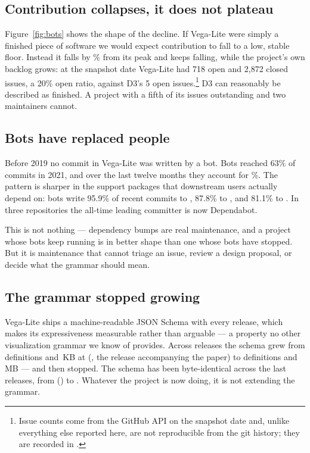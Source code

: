 \documentclass[9pt,twocolumn,letterpaper]{article}
\begin{document}
\subsection{Contribution collapses, it does not plateau}

Figure~\ref{fig:bots} shows the shape of the decline. If Vega-Lite were simply
a finished piece of software we would expect contribution to fall to a low,
stable floor. Instead it falls by \vldecline\% from its \vlpeakyear{} peak and
keeps falling, while the project's own backlog grows: at the snapshot date
Vega-Lite had 718 open and 2{,}872 closed issues, a 20\% open ratio, against
D3's 5 open issues.\footnote{Issue counts come from the GitHub API on the
snapshot date and, unlike everything else reported here, are not reproducible
from the git history; they are recorded in .} D3 can
reasonably be described as finished. A project with a fifth of its issues
outstanding and two maintainers cannot.

\subsection{Bots have replaced people}

Before 2019 no commit in Vega-Lite was written by a bot. Bots reached 63\% of
commits in 2021, and over the last twelve months they account for
\vlbotshare\%. The pattern is sharper in the support packages that downstream
users actually depend on: bots write 95.9\% of recent commits to
, 87.8\% to , and 81.1\% to
. In three repositories the all-time leading committer is
now Dependabot.

This is not nothing --- dependency bumps are real maintenance, and a project
whose bots keep running is in better shape than one whose bots have stopped.
But it is maintenance that cannot triage an issue, review a design proposal, or
decide what the grammar should mean.

\subsection{The grammar stopped growing}

Vega-Lite ships a machine-readable JSON Schema with every release, which makes
its expressiveness measurable rather than arguable --- a property no other
visualization grammar we know of provides. Across \schemareleases{} releases
the schema grew from \schemafirstdefs{} definitions and \schemafirstkb\,KB at
\schemafirsttag{} (\schemafirstyear{}, the release accompanying the paper) to
\schemapeakdefs{} definitions and \schemalastmb\,MB --- and then stopped. The
schema has been byte-identical across the last \schemafrozen{} releases, from
\schemafrozenfrom{} (\schemafrozenfromdate{}) to \schemafrozento{}. Whatever the
project is now doing, it is not extending the grammar.
\end{document}
